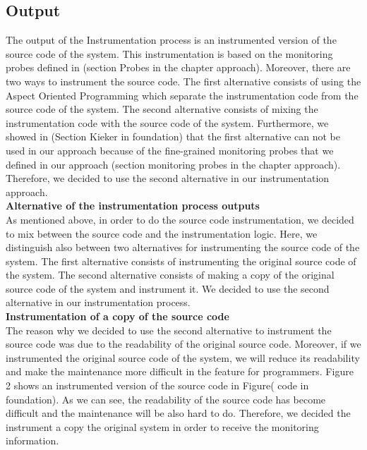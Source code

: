 \subsection{Output}
\label{sec:output}

The output of the Instrumentation process is an instrumented version of the source code of the system.  This instrumentation is based on the monitoring probes defined in (section Probes in the chapter approach). Moreover, there are two ways to instrument the source code. The first alternative consists of using the Aspect Oriented Programming which separate the instrumentation code from the source code of the system. The second alternative consists of mixing the instrumentation code with the source code of the system. Furthermore, we showed in (Section Kieker in  foundation) that the first alternative can not be used in our approach because of the fine-grained monitoring probes that we defined in our approach (section monitoring probes in the chapter approach). Therefore, we decided to use the second alternative in our instrumentation approach.\\

\textbf{Alternative of the instrumentation process outputs}\\
As mentioned above, in order to do the source code instrumentation, we decided to mix between the source code and the instrumentation logic.  Here, we distinguish also between two alternatives for instrumenting the source code of the system. The first alternative consists of instrumenting the original source code of the system. The second alternative consists of making a copy of the original source code of the system and instrument it. We decided to use the second alternative in our instrumentation process. \\

\textbf{Instrumentation of a copy of the source code}\\
The reason why we decided to use the second alternative to instrument the source code was due to the readability of the original source code. Moreover, if we instrumented the original source code of the system, we will reduce its readability and make the maintenance more difficult in the feature for programmers. Figure 2 shows an instrumented version of the source code in Figure( code in foundation). As we can see, the readability of the source code has become difficult and the maintenance will be also hard to do. Therefore, we decided the instrument a copy the original system in order to receive the monitoring information.


